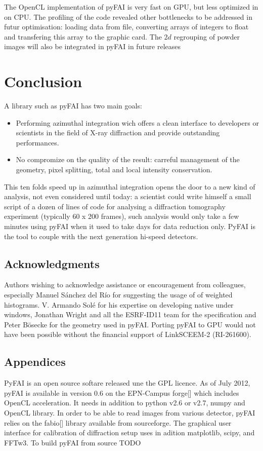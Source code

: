 \documentclass[a4paper]{jpconf}
\begin{document}
The OpenCL implementation of pyFAI is very fast on GPU, but less optimized in on
CPU. The profiling of the code revealed other bottlenecks to be addressed in
futur optimisation:
loading data from file, converting arrays of integers to float and transfering this array to the
graphic card. The $2d$ regrouping of powder images will also be integrated in
pyFAI in future releases 

\section{Conclusion}


A library such as pyFAI has two main goals:
\begin{itemize} 
\item Performing azimuthal integration wich
offers a clean interface to developers or scientists in the field of X-ray
diffraction and provide outstanding performances.
\item No compromize on the quality of the result: carreful management of the
geometry, pixel splitting, total and local intensity conservation.
\end{itemize} 

This ten folds speed up in azimuthal integration opens the door to a new
kind of analysis, not even considered until today: a scientist could write
himself a small script of a dozen of lines of code for analysing a diffraction
tomography experiment (typically 60 x 200 frames),  such analysis would only
take a few minutes using pyFAI when it used to take days for data reduction only.
PyFAI is the tool to couple with the next generation hi-speed detectors.

 
\subsection*{Acknowledgments}
Authors wishing to acknowledge assistance or encouragement from 
colleagues, especially Manuel S\'anchez del R\'io for suggesting the usage of
of weighted histograms.
V. Armando Sol\'e for his expertise on developing native under windows, Jonathan
Wright and all the ESRF-ID11 team for the specification and Peter B\"osecke for
the geometry used in pyFAI. Porting pyFAI to GPU would not have been
possible without the financial support of LinkSCEEM-2 (RI-261600).

\subsection*{Appendices}
PyFAI is an open source softare released une the GPL licence. 
As of July 2012, pyFAI is available in version 0.6 on the EPN-Campus forge[]
which includes OpenCL acceleration.
It needs in addition to python v2.6 or v2.7, numpy and OpenCL library.
In order to be able to read images from various detector, pyFAI relies on the
fabio[] library available from sourceforge. The graphical user interface for 
calibration of diffraction setup uses in adition matplotlib, scipy, and FFTw3.
To build pyFAI from source TODO
\end{document}
